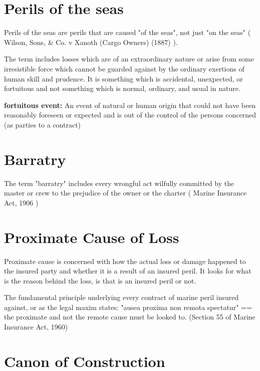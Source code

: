 \section{Perils of the seas}

Perils of the seas are perils that are caused "of the seas", not just "on the seas" ( Wilson, Sons, \& Co. v Xanoth (Cargo Owners) (1887) ).

The term includes losses which are of an extraordinary nature or arise  from some irresistible force which cannot be guarded against by the ordinary exertions of human skill and prudence. It is something which is accidental, unexpected, or fortuitous and not something which is normal, ordinary, and usual in nature.

\textbf{fortuitous event:} An event of natural or human origin that could not have been reasonably foreseen or expected and is out of the control of the persons concerned (as parties to a contract)

\section{Barratry}

The term "barratry" includes every wrongful act wilfully committed by the master or crew to the prejudice of the owner or the charter ( Marine Insurance Act, 1906 )

\section{Proximate Cause of Loss}

Proximate cause is concerned with how the actual loss or damage happened to the insured party and whether it is a result of an insured peril. It looks for what is the reason behind the loss, is that is an insured peril or not.

The fundamental principle underlying every contract of marine peril insured against, or as the legal maxim states: "ausea proxima non remota spectatur" == the proximate and not the remote cause must be looked to. (Section 55 of Marine Insurance Act, 1960)

\section{Canon of Construction}



